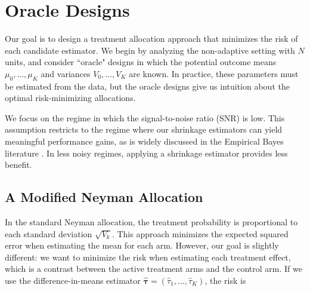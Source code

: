 \documentclass{article}
\newcommand{\bsSigmaN}{\boldsymbol {\Sigma_{\textbf{NA}}}}
\newcommand{\bstau}{\boldsymbol \tau}
\newcommand{\hbstau}{\boldsymbol{\hat \tau}}
\newcommand{\bsdeltad}{\boldsymbol{\hat \delta_{\textbf{D}}}}
\newcommand{\Tr}{\text{tr}}
\newcommand{\bsdeltb}{\boldsymbol {\hat \delta_B}}
\newcommand{\bsdelts}{\boldsymbol {\hat \delta_S}}
\begin{document}
\section{Oracle Designs}\label{sec:oracle}

Our goal is to design a treatment allocation approach that minimizes the risk of each candidate estimator.  We begin by analyzing the non-adaptive setting with $N$ units, and consider ``oracle" designs in which the potential outcome means $\mu_0, \dots, \mu_K$ and variances $V_0, \dots, V_K$ are known. In practice, these parameters must be estimated from the data, but the oracle designs give us intuition about the optimal risk-minimizing allocations.  

We focus on the regime in which the signal-to-noise ratio (SNR) is low. 
This assumption restricts to the regime where our shrinkage estimators can yield meaningful performance gains, as is widely discussed in the Empirical Bayes literature \citep[see e.g.][]{efron2012large}. In less noisy regimes, applying a shrinkage estimator provides less benefit.



\subsection{A Modified Neyman Allocation}

In the standard Neyman allocation, the treatment probability is proportional to each standard deviation $\sqrt{V_k}$. This approach minimizes the expected squared error when estimating the mean for each arm. However, our goal is slightly different: we want to minimize the risk when estimating each treatment effect, which is a contrast between the active treatment arms and the control arm. If we use the difference-in-means estimator $\hbstau = \left( \hat \tau_1, \dots, \hat \tau_K \right)$, the risk is
\end{document}
